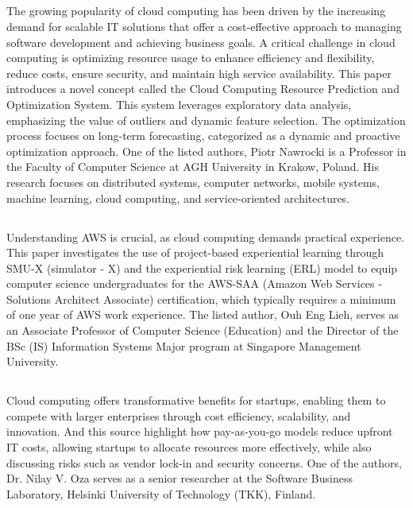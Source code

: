 \documentclass[12pt,letterpaper]{article}
\begin{document}
\subsection*{}
The growing popularity of cloud computing has been driven by the increasing demand for scalable IT solutions that offer a cost-effective approach to managing software development and achieving business goals. A critical challenge in cloud computing is optimizing resource usage to enhance efficiency and flexibility, reduce costs, ensure security, and maintain high service availability. This paper introduces a novel concept called the Cloud Computing Resource Prediction and Optimization System. This system leverages exploratory data analysis, emphasizing the value of outliers and dynamic feature selection. The optimization process focuses on long-term forecasting, categorized as a dynamic and proactive optimization approach. One of the listed authors, Piotr Nawrocki is a Professor in the Faculty of Computer Science at AGH University in Krakow, Poland. His research focuses on distributed systems, computer networks, mobile systems, machine learning, cloud computing, and service-oriented architectures.

\subsection*{}
Understanding AWS is crucial, as cloud computing demands practical experience. This paper investigates the use of project-based experiential learning through SMU-X (simulator - X) and the experiential risk learning (ERL) model to equip computer science undergraduates for the AWS-SAA (Amazon Web Services - Solutions Architect Associate) certification, which typically requires a minimum of one year of AWS work experience. The listed author, Ouh Eng Lieh, serves as an Associate Professor of Computer Science (Education) and the Director of the BSc (IS) Information Systems Major program at Singapore Management University.



\subsection*{}
Cloud computing offers transformative benefits for startups, enabling them to compete with larger enterprises through cost efficiency, scalability, and innovation. And this source highlight how pay-as-you-go models reduce upfront IT costs, allowing startups to allocate resources more effectively, while also discussing risks such as vendor lock-in and security concerns. One of the authors, Dr. Nilay V. Oza serves as a senior researcher at the Software Business Laboratory, Helsinki University of Technology (TKK), Finland.
\end{document}
